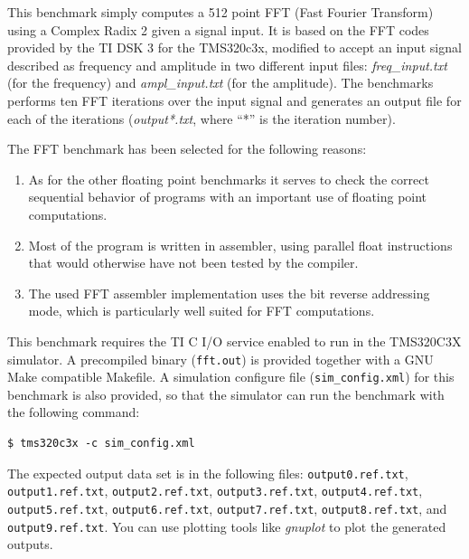 This benchmark simply computes a 512 point FFT (Fast Fourier Transform) using a Complex Radix 2 given a signal input.
It is based on the FFT codes provided by the TI DSK 3 for the TMS320c3x, modified to accept an input signal described as frequency and amplitude in two different input files: \textit{freq\_input.txt} (for the frequency) and \textit{ampl\_input.txt} (for the amplitude).
The benchmarks performs ten FFT iterations over the input signal and generates an output file for each of the iterations (\textit{output*.txt}, where ``*'' is the iteration number).

The FFT benchmark has been selected for the following reasons:
\begin{enumerate}
	\item As for the other floating point benchmarks it serves to check the correct sequential behavior of programs with an important use of floating point computations.
	\item Most of the program is written in assembler, using parallel float instructions that would otherwise have not been tested by the compiler.
	\item The used FFT assembler implementation uses the bit reverse addressing mode, which is particularly well suited for FFT computations.
\end{enumerate} 

This benchmark requires the TI C I/O service enabled to run in the TMS320C3X simulator.
A precompiled binary (\texttt{fft.out}) is provided together with a GNU Make compatible Makefile.
A simulation configure file (\texttt{sim\_config.xml}) for this benchmark is also provided, so that the simulator can run the benchmark with the following command:

\begin{verbatim}
$ tms320c3x -c sim_config.xml
\end{verbatim}

The expected output data set is in the following files: \texttt{output0.ref.txt}, \texttt{output1.ref.txt}, \texttt{output2.ref.txt}, \texttt{output3.ref.txt}, \texttt{output4.ref.txt}, \texttt{output5.ref.txt}, \texttt{output6.ref.txt}, \texttt{output7.ref.txt}, \texttt{output8.ref.txt}, and \texttt{output9.ref.txt}.
You can use plotting tools like \textit{gnuplot} to plot the generated outputs. 

